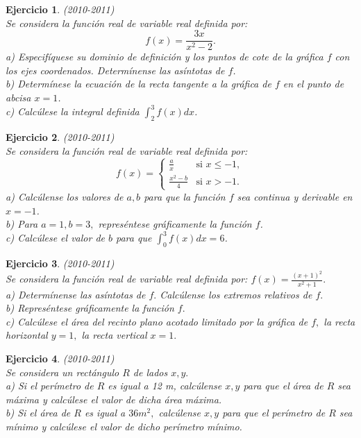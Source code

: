 \documentclass[12pt, a4paper]{amsart}
\newtheorem{ejer}{Ejercicio}
\begin{document}

\begin{ejer}\em (2010-2011)\\
Se considera la función real de variable real definida por:
$$
f(x)=\frac{3x}{x^2-2}.
$$
a) Especifíquese su dominio de definición y los puntos de cote de la gráfica $f$ con los ejes coordenados. Determínense las asíntotas de $f$.\\
b) Determínese la ecuación de la recta tangente a la gráfica de $f$ en el punto de abcisa $x=1$.\\
c) Calcúlese la integral definida $\int_2^3f(x)dx$.
\end{ejer}

\begin{ejer}\em (2010-2011)\\
Se considera la función real de variable real definida por:
\begin{equation*}
f(x)=\left \{ \begin{matrix} \frac{a}{x} & \mbox{si } x\leq -1,
\\ \frac{x^2-b}{4} & \mbox{si } x > -1. \end{matrix}\right. 
\end{equation*}
a) Calcúlense los valores de $a,b$ para que la función $f$ sea continua y derivable en $x=-1$.\\
b) Para $a=1,b=3,$ represéntese gráficamente la función $f$.\\
c) Calcúlese el valor de $b$ para que $\int_0^3f(x)dx=6$.
\end{ejer}


\begin{ejer}\em (2010-2011)\\
Se considera la función real de variable real definida por: $f(x)=\frac{(x+1)^2}{x^2+1}.$\\
a) Determínense las asíntotas de $f.$ Calcúlense los extremos relativos de $f.$\\
b) Represéntese gráficamente la función $f.$\\
c) Calcúlese el área del recinto plano acotado limitado por la gráfica de $f,$ la recta horizontal $y=1,$ la recta vertical $x=1.$
\end{ejer}

\begin{ejer}\em (2010-2011)\\
Se considera un rectángulo $R$ de lados $x,y.$\\
a) Si el perímetro de $R$ es igual a 12 m, calcúlense $x,y$ para que el área de $R$ sea máxima y calcúlese el valor de dicha área máxima.\\
b) Si el área de $R$ es igual a $36 m^2,$ calcúlense $x,y$ para que el perímetro de $R$ sea mínimo y calcúlese el valor de dicho perímetro mínimo.
\end{ejer}
\end{document}
